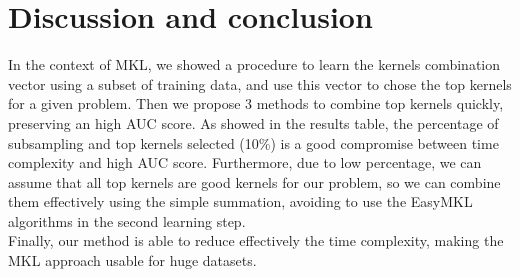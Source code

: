 \documentclass{esannV2}
\newcommand{\1}{{\bf 1}}
\begin{document}
\section{Discussion and conclusion}
In the context of MKL, we showed a procedure to learn the kernels combination vector using a subset of training data, and use this vector to chose the top kernels for a given problem. Then we propose 3 methods to combine top kernels quickly, preserving an high AUC score.
As showed in the results table, the percentage of subsampling and top kernels selected (10\%) is a good compromise between time complexity and high AUC score. Furthermore, due to low percentage, we can assume that all top kernels are good kernels for our problem, so we can combine them effectively using the simple summation, avoiding to use the EasyMKL algorithms in the second learning step.\\
Finally, our method is able to reduce effectively the time complexity, making the MKL approach usable for huge datasets.


\begin{footnotesize}







\end{footnotesize}

\end{document}
